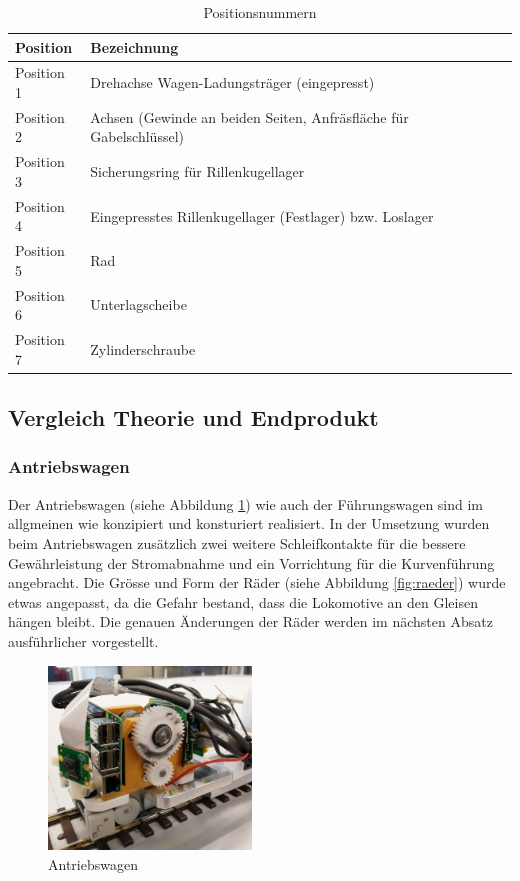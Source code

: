 \documentclass[../../main.tex]{subfiles}
\begin{document}
\begin{table}[H] \centering
  \begin{tabular}{|l|l|}
  \hline
  \textbf{Position} & \textbf{Bezeichnung}\\
  \hline
  Position 1          & Drehachse Wagen-Ladungsträger (eingepresst)\\
   \hline
  Position 2          & Achsen (Gewinde an beiden Seiten, Anfräsfläche für Gabelschlüssel)\\
   \hline
  Position 3          & Sicherungsring für Rillenkugellager\\
  \hline
  Position 4          & Eingepresstes Rillenkugellager (Festlager) bzw. Loslager\\
  \hline
  Position 5          & Rad\\
  \hline
  Position 6          & Unterlagscheibe\\
  \hline
  Position 7          & Zylinderschraube\\
  \hline
  \end{tabular}
\caption{Positionsnummern}
\label{tab:expl_antriebswagen}
\end{table} 

\pagebreak

\subsection{Vergleich Theorie und Endprodukt}

\subsubsection{Antriebswagen}

Der Antriebswagen (siehe Abbildung \ref{fig:antriebswagen3}) wie auch der Führungswagen sind im allgmeinen wie konzipiert und konsturiert realisiert. In der Umsetzung wurden beim Antriebswagen zusätzlich zwei weitere Schleifkontakte für die bessere Gewährleistung der Stromabnahme und ein Vorrichtung für die Kurvenführung angebracht. Die Grösse und Form der Räder (siehe Abbildung \ref{fig:raeder}) wurde etwas angepasst, da die Gefahr bestand, dass die Lokomotive an den Gleisen hängen bleibt. Die genauen Änderungen der Räder werden im nächsten Absatz ausführlicher vorgestellt.\\

\begin{figure}[H]
  \centering
  \includegraphics[width=0.48\textwidth]{antriebswagen1.PNG}
  \caption {Antriebswagen}
  \label{fig:antriebswagen3}
\end{figure}
\end{document}
